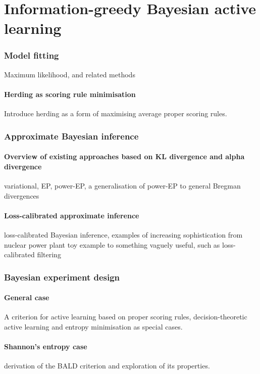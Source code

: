 

\chapter{Information-greedy Bayesian active learning}


\subsection{Model fitting}
Maximum likelihood, and related methods
\subsubsection{Herding as scoring rule minimisation}
Introduce herding as a form of maximising average proper scoring rules.
\subsection{Approximate Bayesian inference}
\subsubsection{Overview of existing approaches based on KL divergence and alpha divergence}
variational, EP, power-EP, a generalisation of power-EP to general Bregman divergences
\subsubsection{Loss-calibrated approximate inference}
loss-calibrated Bayesian inference, examples of increasing sophistication from nuclear power plant toy example to something vaguely useful, such as loss-calibrated filtering
\subsection{Bayesian experiment design}
\subsubsection{General case}
A criterion for active learning based on proper scoring rules, decision-theoretic active learning and entropy minimisation as special cases.
\subsubsection{Shannon's entropy case}
derivation of the BALD criterion and exploration of its properties.
